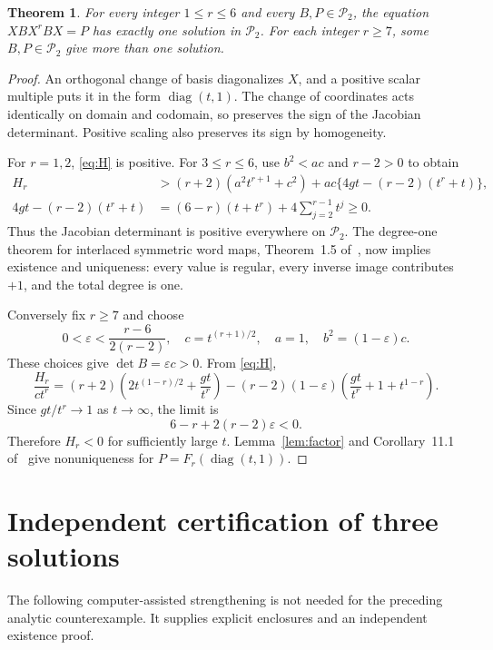 \documentclass[11pt]{article}
\newtheorem{theorem}{Theorem}
\newcommand{\SPD}{\mathcal P_2}
\newcommand{\diag}{\operatorname{diag}}
\begin{document}
\begin{theorem}\label{thm:threshold}
For every integer $1\le r\le6$ and every $B,P\in\SPD$, the equation $XBX^rBX=P$ has exactly one solution in $\SPD$. For each integer $r\ge7$, some $B,P\in\SPD$ give more than one solution.
\end{theorem}
\begin{proof}
An orthogonal change of basis diagonalizes $X$, and a positive scalar multiple puts it in the form $\diag(t,1)$. The change of coordinates acts identically on domain and codomain, so preserves the sign of the Jacobian determinant. Positive scaling also preserves its sign by homogeneity.

For $r=1,2$, \eqref{eq:H} is positive. For $3\le r\le6$, use $b^2<ac$ and $r-2>0$ to obtain
\begin{align*}
H_r &> (r+2)(a^2t^{r+1}+c^2)
      +ac\{4gt-(r-2)(t^r+t)\},\\
4gt-(r-2)(t^r+t)
 &= (6-r)(t+t^r)+4\sum_{j=2}^{r-1}t^j\ge0.
\end{align*}
Thus the Jacobian determinant is positive everywhere on $\SPD$. The degree-one theorem for interlaced symmetric word maps, Theorem~1.5 of~\cite{AH}, now implies existence and uniqueness: every value is regular, every inverse image contributes $+1$, and the total degree is one.

Conversely fix $r\ge7$ and choose
\[
0<\varepsilon<\frac{r-6}{2(r-2)},\quad
c=t^{(r+1)/2},\quad a=1,\quad b^2=(1-\varepsilon)c.
\]
These choices give $\det B=\varepsilon c>0$. From \eqref{eq:H},
\[
\frac{H_r}{ct^r}
=(r+2)\left(2t^{(1-r)/2}+\frac{gt}{t^r}\right)
 -(r-2)(1-\varepsilon)\left(\frac{gt}{t^r}+1+t^{1-r}\right).
\]
Since $gt/t^r\to1$ as $t\to\infty$, the limit is
\[
6-r+2(r-2)\varepsilon<0.
\]
Therefore $H_r<0$ for sufficiently large $t$. Lemma~\ref{lem:factor} and Corollary~11.1 of~\cite{AH} give nonuniqueness for $P=F_r(\diag(t,1))$.
\end{proof}

\section{Independent certification of three solutions}
The following computer-assisted strengthening is not needed for the preceding analytic counterexample. It supplies explicit enclosures and an independent existence proof.
\end{document}
